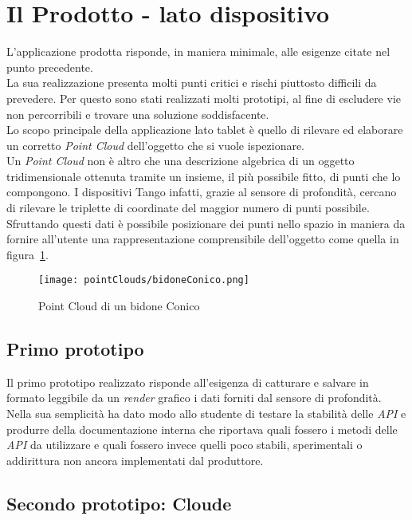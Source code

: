 \section{Il Prodotto - lato dispositivo}
L'applicazione prodotta risponde, in maniera minimale, alle esigenze citate nel punto precedente.\\
La sua realizzazione presenta molti punti critici e rischi piuttosto difficili da prevedere. Per questo sono stati realizzati molti prototipi, al fine di escludere vie non percorribili e trovare una soluzione soddisfacente.\\
Lo scopo principale della applicazione lato tablet è quello di rilevare ed elaborare un corretto \emph{Point Cloud} dell'oggetto che si vuole ispezionare.\\
Un \emph{Point Cloud} non è altro che una descrizione algebrica di un oggetto tridimensionale ottenuta tramite un insieme, il più possibile fitto, di punti che lo compongono. I dispositivi Tango infatti, grazie al sensore di profondità, cercano di rilevare le triplette di coordinate del maggior numero di punti possibile. Sfruttando questi dati è possibile posizionare dei punti nello spazio in maniera da fornire all'utente una rappresentazione comprensibile dell'oggetto come quella in figura~\ref{figure:bidone_conico}.
\begin{figure}[H] 
    \centering 
    \texttt{[image: pointClouds/bidoneConico.png]}
    \caption{Point Cloud di un bidone Conico}
    \label{figure:bidone_conico} 
\end{figure}


\subsection{Primo prototipo}
Il primo prototipo realizzato risponde all'esigenza di catturare e salvare in formato leggibile da un \emph{render} grafico i dati forniti dal sensore di profondità.
Nella sua semplicità ha dato modo allo studente di testare la stabilità delle \emph{API} e produrre della documentazione interna che riportava quali fossero i metodi delle \emph{API} da utilizzare e quali fossero invece quelli poco stabili, sperimentali o addirittura non ancora implementati dal produttore.

\subsection{Secondo prototipo: Cloude}
